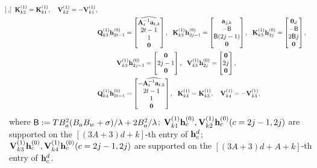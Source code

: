 \begin{align*}
\begin{bmatrix}
    \end{bmatrix},~~  \bK^{(1)}_{k2}=\bK^{(1)}_{k1},~~  \ \bV^{(1)}_{k2}=-\bV^{(1)}_{k1},\\
    &
    \bQ^{(1)}_{k3}\bh^{(0)}_{2t-1}=\begin{bmatrix}
        \widehat{\bA_t^{-1}\ba_{t,k}} \\2t-1\\ 1\\\bzero
    \end{bmatrix},~~ \bK^{(1)}_{k3}\bh^{(0)}_{2j-1}=\begin{bmatrix}
        \ba_{j,k}\\  -\tfthres \\ \tfthres (2j-1)\\\bzero
    \end{bmatrix},~~ 
    \bK^{(1)}_{k3}\bh^{(0)}_{2j}=\begin{bmatrix}
        \bzero_d\\  -\tfthres \\ 2\tfthres j\\\bzero
    \end{bmatrix},\\
    &
    \qquad~~~ \bV^{(1)}_{k3}\bh^{(0)}_{2j-1}=\begin{bmatrix}
        \bzero\\ 2j-1 \\ \bzero
    \end{bmatrix},~~ \bV^{(1)}_{k3}\bh^{(0)}_{2j}=\begin{bmatrix}
        \bzero\\ 2j \\ \bzero
    \end{bmatrix},\\
    &
    \bQ^{(1)}_{k4}\bh^{(0)}_{2t-1}=\begin{bmatrix}
        - \widehat{\bA_t^{-1}\ba_{t,k}} \\2t-1\\1\\\bzero
    \end{bmatrix},~~  \bK^{(1)}_{k4}=\bK^{(1)}_{k3},~~  \ \bV^{(1)}_{k4}=-\bV^{(1)}_{k3},
\end{align*}
where ${\mathsf{B}}:=TB_a^2(B_aB_w+\sigma)/\lambda+2B_a^2/\lambda$; ${\mathbf V}^{(1)}_{k1}{\mathbf h}^{(0)}_{c},{\mathbf V}^{(1)}_{k2}{\mathbf h}^{(0)}_{c} (c=2j-1,2j)$ are supported on the $[(3A+3)d+k]$-th entry of ${\mathbf h}_c^{{d}}$; ${\mathbf V}^{(1)}_{k3}{\mathbf h}^{(0)}_{c},{\mathbf V}^{(1)}_{k4}{\mathbf h}^{(0)}_{c} (c=2j-1,2j)$ are supported on the $[(3A+3)d+A+k]$-th entry of ${\mathbf h}_c^{{d}}$. 

